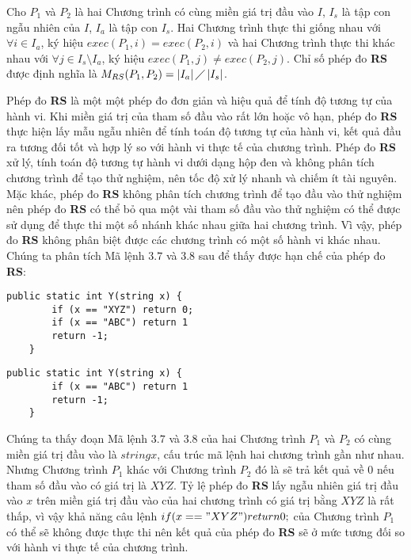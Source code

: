 \begin{definition}[Phép đo RS]
Cho $P_{1}$ và $P_{2}$ là hai Chương trình có cùng miền giá trị đầu vào $I$, $I_{s}$ là tập con ngẫu nhiên của $I$, $I_{a}$ là tập con $I_{s}$. Hai Chương trình thực thi giống nhau với $\forall i \in I_{a}$, ký hiệu $exec(P_{1}, i) = exec(P_{2}, i)$ và hai Chương trình thực thi khác nhau với $\forall j \in I_{s} \setminus I_{a}$, ký hiệu $exec(P_{1}, j) \neq exec(P_{2}, j)$. Chỉ số phép đo \textbf{RS} được định nghĩa là $M_{RS}(P_{1}, P_{2}) = \left|I_{a}\right| \diagup \left|I_{s}\right| $.
\end{definition}

Phép đo \textbf{RS} là một một phép đo đơn giản và hiệu quả để tính độ tương tự của hành vi. Khi miền giá trị của tham số đầu vào rất lớn hoặc vô hạn, phép đo \textbf{RS} thực hiện lấy mẫu ngẫu nhiên để tính toán độ tương tự của hành vi, kết quả đầu ra tương đối tốt và hợp lý so với hành vi thực tế của chương trình. Phép đo \textbf{RS} xử lý, tính toán độ tương tự hành vi dưới dạng hộp đen và không phân tích chương trình để tạo thử nghiệm, nên tốc độ xử lý nhanh và chiếm ít tài nguyên. Mặc khác, phép đo \textbf{RS} không phân tích chương trình để tạo đầu vào thử nghiệm nên phép đo \textbf{RS} có thể bỏ qua một vài tham số đầu vào thử nghiệm có thể được sử dụng để thực thi một số nhánh khác nhau giữa hai chương trình. Vì vậy, phép đo \textbf{RS} không phân biệt được các chương trình có một số hành vi khác nhau. Chúng ta phân tích Mã lệnh $3.7$ và $3.8$ sau để thấy được hạn chế của phép đo \textbf{RS}:

\begin{minipage}[t]{0.45\linewidth}
	\begin{lstlisting}[caption={Chương trình $P_{1}$}, label={Script}]
	public static int Y(string x) {
		if (x == "XYZ") return 0;
		if (x == "ABC")	return 1	
		return -1;
	}
	\end{lstlisting}
\end{minipage}%
\hfill\vrule\hfill
\begin{minipage}[t]{0.45\linewidth}
	\begin{lstlisting}[caption={Chương trình $P_{2}$}, label={Script}]
	public static int Y(string x) {
		if (x == "ABC")	return 1	
		return -1;
	}
	\end{lstlisting}
\end{minipage}%

Chúng ta thấy đoạn Mã lệnh $3.7$ và $3.8$ của hai Chương trình $P_{1}$ và $P_{2}$ có cùng miền giá trị đầu vào là $string x$, cấu trúc mã lệnh hai chương trình gần như nhau. Nhưng Chương trình $P_{1}$ khác với Chương trình $P_{2}$ đó là sẽ trả kết quả về $0$ nếu tham số đầu vào có giá trị là $XYZ$. Tỷ lệ phép đo \textbf{RS} lấy ngẫu nhiên giá trị đầu vào $x$ trên miền giá trị đầu vào của hai chương trình có giá trị bằng $XYZ$ là rất thấp, vì vậy khả năng câu lệnh $if (x == "XYZ") return 0;$ của Chương trình $P_{1}$ có thể sẽ không được thực thi nên kết quả của phép đo \textbf{RS} sẽ ở mức tương đối so với hành vi thực tế của chương trình.
	
